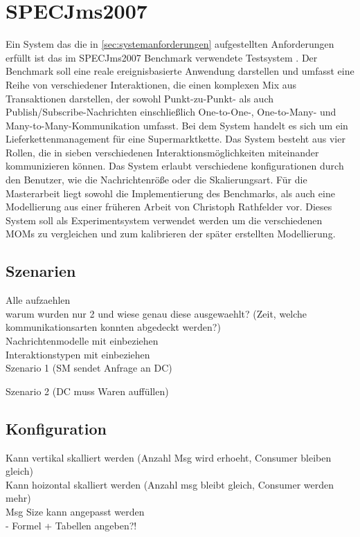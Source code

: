 \section{SPECJms2007}
Ein System das die in \autoref{sec:systemanforderungen} aufgestellten Anforderungen erfüllt ist das im SPECJms2007 Benchmark verwendete Testsystem \cite{Sachs2013}. Der Benchmark soll eine reale ereignisbasierte Anwendung darstellen und umfasst eine Reihe von verschiedener Interaktionen, die einen komplexen Mix aus Transaktionen darstellen, der sowohl Punkt-zu-Punkt- als auch Publish/Subscribe-Nachrichten einschließlich One-to-One-, One-to-Many- und Many-to-Many-Kommunikation umfasst. Bei dem System handelt es sich um ein Lieferkettenmanagement für eine Supermarktkette. Das System besteht aus vier Rollen, die in sieben verschiedenen Interaktionsmöglichkeiten miteinander kommunizieren können. Das System erlaubt verschiedene konfigurationen durch den Benutzer, wie die Nachrichtenröße oder die Skalierungsart. Für die Masterarbeit liegt sowohl die Implementierung des Benchmarks, als auch eine Modellierung aus einer früheren Arbeit von Christoph Rathfelder \cite{Rathfelder2013} vor. Dieses System soll als Experimentsystem verwendet werden um die verschiedenen MOMs zu vergleichen und zum kalibrieren der später erstellten Modellierung. 

\subsection{Szenarien}
Alle aufzaehlen\\
warum wurden nur 2 und wiese genau diese ausgewaehlt? (Zeit, welche kommunikationsarten konnten abgedeckt werden?)\\
Nachrichtenmodelle mit einbeziehen \\
Interaktionstypen mit einbeziehen \\
Szenario 1 (SM sendet Anfrage an DC)

Szenario 2 (DC muss Waren auffüllen)

\subsection{Konfiguration}
Kann vertikal skalliert werden (Anzahl Msg wird erhoeht, Consumer bleiben gleich)\\
Kann hoizontal skalliert werden (Anzahl msg bleibt gleich, Consumer werden mehr)\\
Msg Size kann angepasst werden\\
- Formel + Tabellen angeben?!

